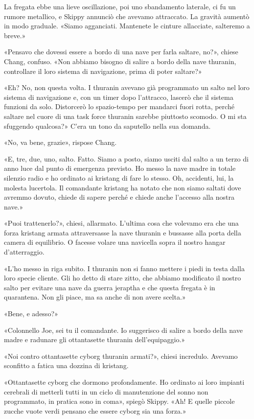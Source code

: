 La fregata ebbe una lieve oscillazione, poi uno sbandamento laterale, ci
fu un rumore metallico, e Skippy annunciò che avevamo attraccato. La
gravità aumentò in modo graduale. «Siamo agganciati. Mantenete le
cinture allacciate, salteremo a breve.»

«Pensavo che dovessi essere a bordo di una nave per farla saltare, no?»,
chiese Chang, confuso. «Non abbiamo bisogno di salire a bordo della nave
thuranin, controllare il loro sistema di navigazione, prima di poter
saltare?»

«Eh? No, non questa volta. I thuranin avevano già programmato un salto
nel loro sistema di navigazione e, con un timer dopo l'attracco, lascerò
che il sistema funzioni da solo. Distorcerò lo spazio-tempo per mandarci
fuori rotta, perché saltare nel cuore di una task force thuranin sarebbe
piuttosto scomodo. O mi sta sfuggendo qualcosa?» C'era un tono da
saputello nella sua domanda.

«No, va bene, grazie», rispose Chang.

«E, tre, due, uno, salto. Fatto. Siamo a posto, siamo usciti dal salto a
un terzo di anno luce dal punto di emergenza previsto. Ho messo la nave
madre in totale silenzio radio e ho ordinato ai kristang di fare lo
stesso. Oh, accidenti, lui, la molesta lucertola. Il comandante kristang
ha notato che non siamo saltati dove avremmo dovuto, chiede di sapere
perché e chiede anche l'accesso alla nostra nave.»

«Puoi trattenerlo?», chiesi, allarmato. L'ultima cosa che volevamo era
che una forza kristang armata attraversasse la nave thuranin e bussasse
alla porta della camera di equilibrio. O facesse volare una navicella
sopra il nostro hangar d'atterraggio.

«L'ho messo in riga subito. I thuranin non si fanno mettere i piedi in
testa dalla loro specie cliente. Gli ho detto di stare zitto, che
abbiamo modificato il nostro salto per evitare una nave da guerra
jeraptha e che questa fregata è in quarantena. Non gli piace, ma sa
anche di non avere scelta.»

«Bene, e adesso?»

«Colonnello Joe, sei tu il comandante. Io suggerisco di salire a bordo
della nave madre e radunare gli ottantasette thuranin dell'equipaggio.»

«Noi contro ottantasette cyborg thuranin armati?», chiesi incredulo.
Avevamo sconfitto a fatica una dozzina di kristang.

«Ottantasette cyborg che dormono profondamente. Ho ordinato ai loro
impianti cerebrali di metterli tutti in un ciclo di manutenzione del
sonno non programmato, in pratica sono in coma», spiegò Skippy. «Ah! E
quelle piccole zucche vuote verdi pensano che essere cyborg sia una
forza.»

